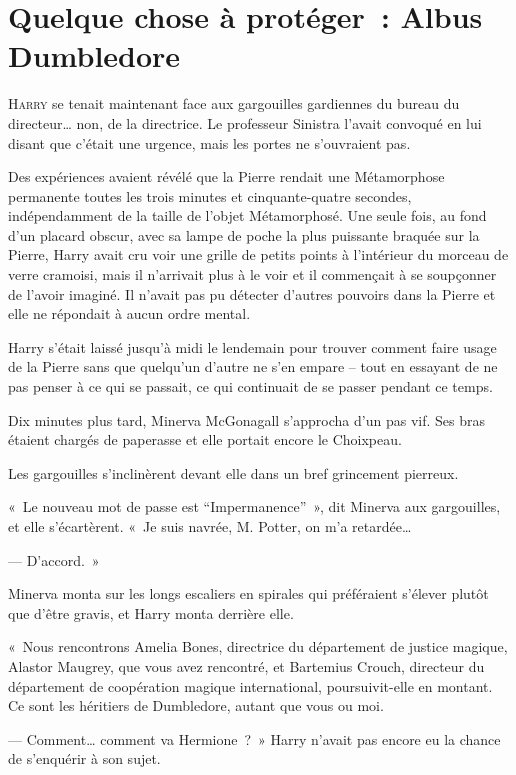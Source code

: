 \chapter{Quelque chose à protéger~: Albus Dumbledore}

\lettrine{H}{arry} se tenait maintenant face aux gargouilles gardiennes du bureau du directeur… non, de la directrice.
Le professeur Sinistra l'avait convoqué en lui disant que c'était une urgence, mais les portes ne s'ouvraient pas.

Des expériences avaient révélé que la Pierre rendait une Métamorphose permanente toutes les trois minutes et cinquante-quatre secondes, indépendamment de la taille de l'objet Métamorphosé.
Une seule fois, au fond d'un placard obscur, avec sa lampe de poche la plus puissante braquée sur la Pierre, Harry avait cru voir une grille de petits points à l'intérieur du morceau de verre cramoisi, mais il n'arrivait plus à le voir et il commençait à se soupçonner de l'avoir imaginé.
Il n'avait pas pu détecter d'autres pouvoirs dans la Pierre et elle ne répondait à aucun ordre mental.

Harry s'était laissé jusqu'à midi le lendemain pour trouver comment faire usage de la Pierre sans que quelqu'un d'autre ne s'en empare -- tout en essayant de ne pas penser à ce qui se passait, ce qui continuait de se passer pendant ce temps.

Dix minutes plus tard, Minerva McGonagall s'approcha d'un pas vif.
Ses bras étaient chargés de paperasse et elle portait encore le Choixpeau.

Les gargouilles s'inclinèrent devant elle dans un bref grincement pierreux.

«~Le nouveau mot de passe est “Impermanence”~», dit Minerva aux gargouilles, et elle s'écartèrent.
«~Je suis navrée, M. Potter, on m'a retardée…

--- D'accord.~»

Minerva monta sur les longs escaliers en spirales qui préféraient s'élever plutôt que d'être gravis, et Harry monta derrière elle.

«~Nous rencontrons Amelia Bones, directrice du département de justice magique, Alastor Maugrey, que vous avez rencontré, et Bartemius Crouch, directeur du département de coopération magique international, poursuivit-elle en montant.
Ce sont les héritiers de Dumbledore, autant que vous ou moi.

--- Comment… comment va Hermione~?~»
Harry n'avait pas encore eu la chance de s'enquérir à son sujet.

